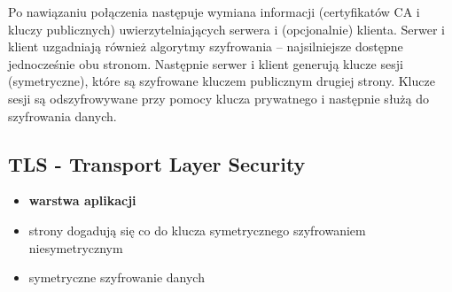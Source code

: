 \documentclass[../main.tex]{subfiles}
\begin{document}
    Po nawiązaniu połączenia następuje wymiana informacji (certyfikatów CA i kluczy publicznych)
    uwierzytelniających serwera i (opcjonalnie) klienta.
    Serwer i klient uzgadniają również algorytmy szyfrowania – najsilniejsze dostępne jednocześnie obu stronom.
    Następnie serwer i klient generują klucze sesji (symetryczne), które są szyfrowane kluczem
    publicznym drugiej strony. Klucze sesji są odszyfrowywane przy pomocy klucza prywatnego i
    następnie służą do szyfrowania danych.

    \subsection{TLS - Transport Layer Security}
    \begin{itemize}
        \item \textbf{warstwa aplikacji}
        \item strony dogadują się co do klucza symetrycznego szyfrowaniem niesymetrycznym
        \item symetryczne szyfrowanie danych
    \end{itemize}
\end{document}
